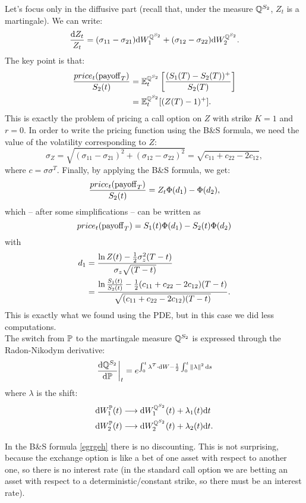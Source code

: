 Let's focus only in the diffusive part (recall that, under the measure $\mathbb{Q}^{S_2}$, $Z_t$ is a martingale). We can write:
\begin{equation}
    \frac{\dd Z_t}{Z_t} = (\sigma_{11}- \sigma_{21})\dd W_1^{\mathbb{Q}^{S_2}} + (\sigma_{12}- \sigma_{22})\dd W_2^{\mathbb{Q}^{S_2}}.
\end{equation}
The key point is that:
\begin{align}
    \frac{price_t(\operatorname{payoff}_T)}{S_2(t)} &= \mathbb{E}_t^{\mathbb{Q}^{S_2}} \left[\frac{(S_1(T)-S_2(T))^+}{S_2(T)}\right]\\
    &=
    \mathbb{E}_t^{\mathbb{Q}^{S_2}}[(Z(T)-1)^+].
\end{align}
This is exactly the problem of pricing a call option on $Z$ with strike $K=1$ and $r=0$. In order to write the pricing function using the B\&S formula, we need the value of the volatility corresponding to $Z$:
\begin{equation}
    \sigma_Z = \sqrt{(\sigma_{11}- \sigma_{21})^2 + (\sigma_{12}- \sigma_{22})^2} = \sqrt{c_{11}+c_{22}-2c_{12}},
\end{equation}
where $c=\sigma\sigma^T$. Finally, by applying the B\&S formula, we get:
\begin{equation}
    \frac{price_t(\operatorname{payoff}_T)}{S_2(t)} = Z_t\Phi(d_1) - \Phi(d_2),
\end{equation}
which -- after some simplifications -- can be written as
\begin{equation}\label{egrgeh}
    price_t(\operatorname{payoff}_T) = S_1(t)\Phi(d_1) - S_2(t)\Phi(d_2)
\end{equation}
with
\begin{align}
    \notag d_1 &= \dfrac{\ln Z(t)-\frac{1}{2}\sigma_z^2(T-t)}{\sigma_z \sqrt{(T-t)}} \\
    &=
    \dfrac{\ln\frac{S_1(t)}{S_2(t)}-\frac{1}{2}(c_{11}+c_{22}-2c_{12})(T-t)}{\sqrt{(c_{11}+c_{22}-2c_{12})(T-t)}}.
\end{align}
This is exactly what we found using the PDE, but in this case we did less computations.\\
The switch from $\mathbb{P}$ to the martingale measure $\mathbb{Q}^{S_2}$ is expressed through the Radon-Nikodym derivative:
\begin{equation}\label{bsex}
    \eval{\frac{\dd\Qmeas^{S_2}}{\dd\Pmeas}}_t = e^{\int_0^t\lambda^T\cdot\dd W - \frac{1}{2}\int_0^t \norm{\lambda}^2\,\dd s}
\end{equation}
where $\lambda$ is the shift:
\begin{align}
    \dd W_1^{\mathbb{P}}(t) &\longrightarrow \dd W_1^{\mathbb{Q}^{S_2}}(t) + \lambda_1(t)\dd t\\
    \dd W_2^{\mathbb{P}}(t) &\longrightarrow \dd W_2^{\mathbb{Q}^{S_2}}(t) + \lambda_2(t)\dd t.
\end{align}
\begin{remark}
    In the B\&S formula \eqref{egrgeh} there is no discounting. This is not surprising, because the exchange option is like a bet of one asset with respect to another one, so there is no interest rate (in the standard call option we are betting an asset with respect to a deterministic/constant strike, so there must be an interest rate).
\end{remark}

